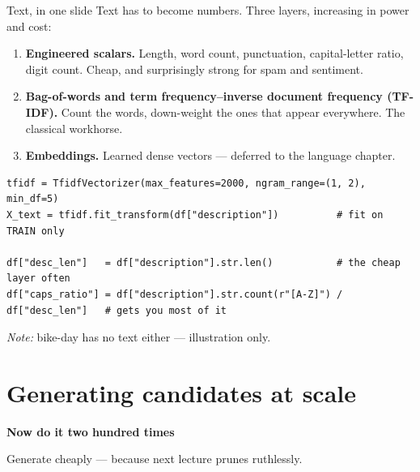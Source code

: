 \documentclass[aspectratio=169]{beamer}
\begin{document}
\begin{frame}[fragile]{Text, in one slide}
  Text has to become numbers. Three layers, increasing in power and cost:
  \vfill
  \begin{enumerate}\small
    \item \textbf{Engineered scalars.} Length, word count, punctuation, capital-letter ratio,
      digit count. Cheap, and surprisingly strong for spam and sentiment.
    \item \textbf{Bag-of-words and term frequency--inverse document frequency (TF-IDF).}
      Count the words, down-weight the ones that appear everywhere. The classical workhorse.
    \item \textbf{Embeddings.} Learned dense vectors --- deferred to the language chapter.
  \end{enumerate}
  \vfill
{\lstset{basicstyle=\ttfamily\scriptsize}
\begin{lstlisting}
tfidf = TfidfVectorizer(max_features=2000, ngram_range=(1, 2), min_df=5)
X_text = tfidf.fit_transform(df["description"])          # fit on TRAIN only

df["desc_len"]   = df["description"].str.len()           # the cheap layer often
df["caps_ratio"] = df["description"].str.count(r"[A-Z]") / df["desc_len"]   # gets you most of it
\end{lstlisting}}
  \vfill
  \footnotesize \emph{Note:} bike-day has no text either --- illustration only.
\end{frame}

\section{Generating candidates at scale}

\begin{frame}[plain]
  \vfill
  \begin{center}
    {\Large\color{popblue}\textbf{Now do it two hundred times}}\\[0.9em]
    \begin{minipage}{0.82\textwidth}\centering\small
      Generate cheaply --- because next lecture prunes ruthlessly.
    \end{minipage}
  \end{center}
  \vfill
\end{frame}
\end{document}
